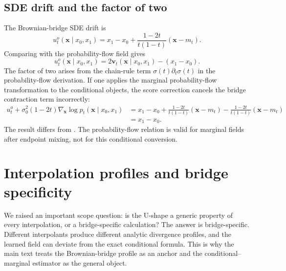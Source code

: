 \documentclass{article}
\newcommand{\vx}{\bm{x}}
\newcommand{\vv}{\bm{v}}
\theoremstyle{plain}
\theoremstyle{definition}
\theoremstyle{remark}
\begin{document}
\subsection{SDE drift and the factor of two}
\label{app:sde_ode_details}

The Brownian-bridge SDE drift is
\begin{equation}
  u^o_t(\vx\mid x_0,x_1)
  =
  x_1-x_0
  +
  \frac{1-2t}{t(1-t)}(\vx-m_t).
\end{equation}
Comparing with the probability-flow field gives
\begin{equation}
  u^o_t(\vx\mid x_0,x_1)
  =
  2\vv_t(\vx\mid x_0,x_1)-(x_1-x_0).
\end{equation}
The factor of two arises from the chain-rule term $\sigma(t)\partial_t\sigma(t)$ in the probability-flow derivation. If one applies the marginal probability-flow transformation to the conditional objects, the score correction cancels the bridge contraction term incorrectly:
\begin{align}
  u^o_t+\sigma_0^2(1-2t)\nabla_{\vx}\log p_t(\vx\mid x_0,x_1)
  &=
  x_1-x_0
  +
  \frac{1-2t}{t(1-t)}(\vx-m_t)
  -
  \frac{1-2t}{t(1-t)}(\vx-m_t) \\
  &=
  x_1-x_0.
\end{align}
The result differs from . The probability-flow relation is valid for marginal fields after endpoint mixing, not for this conditional conversion.

\section{Interpolation profiles and bridge specificity}
\label{app:interpolation_profiles}

We raised an important scope question: is the U-shape a generic property of every interpolation, or a bridge-specific calculation? The answer is bridge-specific. Different interpolants produce different analytic divergence profiles, and the learned field can deviate from the exact conditional formula. This is why the main text treats the Brownian-bridge profile as an anchor and the conditional--marginal estimator as the general object.
\end{document}
